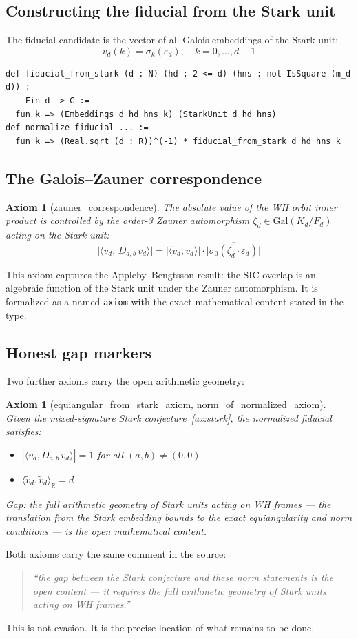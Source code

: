 \documentclass[12pt,a4paper]{article}
\newtheorem{axiom_env}[theorem]{Axiom}
\begin{document}
\subsection{Constructing the fiducial from the Stark unit}
The fiducial candidate is the vector of all Galois embeddings of the Stark unit:
\[
v_d(k) = \sigma_k(\varepsilon_d),\quad k = 0,\ldots,d-1
\]
\begin{lstlisting}
def fiducial_from_stark (d : N) (hd : 2 <= d) (hns : not IsSquare (m_d d)) :
    Fin d -> C :=
  fun k => (Embeddings d hd hns k) (StarkUnit d hd hns)
def normalize_fiducial ... :=
  fun k => (Real.sqrt (d : R))^(-1) * fiducial_from_stark d hd hns k
\end{lstlisting}
\subsection{The Galois--Zauner correspondence}
\begin{axiom_env}[zauner\_correspondence]
\label{ax:zauner-corr}
The absolute value of the WH orbit inner product is controlled by the
order-3 Zauner automorphism $\zeta_d \in \mathrm{Gal}(K_d/F_d)$ acting
on the Stark unit:
\[
\big|\langle v_d,\, D_{a,b}\,v_d\rangle\big|
= \big|\langle v_d, v_d\rangle\big| \cdot
\big|\overline{\sigma_0(\zeta_d \cdot \varepsilon_d)}\big|
\]
\end{axiom_env}
This axiom captures the Appleby--Bengtsson result: the SIC overlap is an
algebraic function of the Stark unit under the Zauner automorphism. It is
formalized as a named \texttt{axiom} with the exact mathematical content
stated in the type.
\subsection{Honest gap markers}
Two further axioms carry the open arithmetic geometry:
\begin{axiom_env}[equiangular\_from\_stark\_axiom, norm\_of\_normalized\_axiom]
\label{ax:gap}
Given the mixed-signature Stark conjecture~\ref{ax:stark}, the normalized
fiducial satisfies:
\begin{itemize}
  \item $|\langle \tilde{v}_d, D_{a,b}\,\tilde{v}_d\rangle| = 1$ for all $(a,b)\neq(0,0)$
  \item $\langle\tilde{v}_d, \tilde{v}_d\rangle_{\mathbb{R}} = d$
\end{itemize}
\emph{Gap:} the full arithmetic geometry of Stark units acting on WH frames --- the
translation from the Stark embedding bounds to the exact equiangularity and norm
conditions --- is the open mathematical content.
\end{axiom_env}
Both axioms carry the same comment in the source:
\begin{quotation}
\noindent\textit{``the gap between the Stark conjecture and these norm statements
is the open content --- it requires the full arithmetic geometry of Stark units
acting on WH frames.''}
\end{quotation}
This is not evasion. It is the precise location of what remains to be done.
\end{document}
